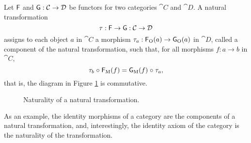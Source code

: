 \begin{definition}
  \label{def:natural}


  Let $\mathsf{F}$ and $\mathsf{G}: \mathcal{C} \to \mathcal{D}$ be functors for
  two categories $\cat{C}$ and $\cat{D}$. A natural transformation
  \begin{equation*}
    \tau: \mathsf{F} \to \mathsf{G}: \mathcal{C} \to \mathcal{D}
  \end{equation*}
  assigns to each object $a$ in $\cat{C}$ a morphism $\tau_{a}:
  \mathsf{F}_{\operatorname{O}}(a) \to \mathsf{G}_{\operatorname{O}}(a)$ in $\cat{D}$, called a component of
  the natural transformation, such that, for all morphisms $f: a \to
  b$ in $\cat{C}$,
  \begin{equation}
    \label{eq:naturality}
    \tau_{b} \mathrel{\circ} \mathsf{F}_{\operatorname{M}}(f) = \mathsf{G}_{\operatorname{M}}(f) \mathrel{\circ} \tau_{a}
    \text{,}
  \end{equation}
  that is, the diagram in Figure \ref{fig:naturality} is commutative.

  \begin{figure}[htb]
    \begin{center}
    \end{center}
    \caption{Naturality of a natural transformation.}
    \label{fig:naturality}
  \end{figure}

\end{definition}

As an example, the identity morphisms of a category are the components
of a natural transformation, and, interestingly, the identity axiom of
the category is the naturality of the transformation.

